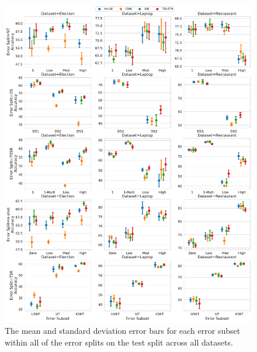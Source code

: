 \begin{figure}[h!]
    \centering
    \includegraphics[scale=0.45]{images/augmentation/methods_performance/baseline/test_error_subsets.pdf}
    \caption{The mean and standard deviation error bars for each error subset within all of the error splits on the test split across all datasets.}
    \label{fig:aug_baseline_test_error_subset}
\end{figure}

